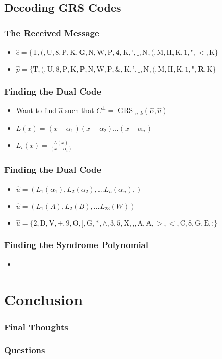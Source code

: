 \documentclass{beamer}
\begin{document}
\subsection{Decoding GRS Codes}

\begin{frame}
	\frametitle{The Received Message}
	\begin{itemize}
		\item $\hat{c} = \{\text{T}, \text{(}, \text{U}, \text{8}, \text{P}, \text{K}, \textbf{G}, \text{N}, \text{W}, \text{P}, \textbf{4}, \text{K}, \text{'}, \text{\_}, \text{N}, \text{(}, \text{M}, \text{H}, \text{K}, \text{1}, \text{"}, <, \text{K}\}$
		\item $\hat{p} = \{\text{T}, \text{(}, \text{U}, \text{8}, \text{P}, \text{K}, \textbf{P}, \text{N}, \text{W}, \text{P}, \textbf{\&}, \text{K}, \text{'}, \text{\_}, \text{N}, \text{(}, \text{M}, \text{H}, \text{K}, \text{1}, \text{"}, \textbf{R}, \text{K}\}$
	\end{itemize}
\end{frame}

\begin{frame}
	\frametitle{Finding the Dual Code}
	\begin{itemize}
		\item Want to find $\hat{u}$ such that $C^{\perp} = $ GRS $_{n,k}(\hat{\alpha}, \hat{u})$
		\item $L(x) = (x - \alpha_{1})(x - \alpha_{2})...(x - \alpha_{n})$
		\item $L_{i}(x) = \frac{L(x)}{(x - \alpha_{i})}$
	\end{itemize}
\end{frame}

\begin{frame}
	\frametitle{Finding the Dual Code}
	\begin{itemize}
		\item $\hat{u} = (L_{1}(\alpha_{1}), L_{2}(\alpha_{2}), ... L_{n}(\alpha_{n}),) $
		\item $\hat{u} = (L_{1}(A), L_{2}(B), ... L_{23}(W)) $
		\item $\hat{u} = \{\text{2}, \text{D}, \text{V}, +, \text{9}, \text{O}, ], \text{G}, *, \wedge, \text{3}, \text{5}, \text{X}, \text{,}, \text{A}, \text{A}, >, <, \text{C}, \text{8}, \text{G}, \text{E}, \text{:}\} $
	\end{itemize}
\end{frame}

\begin{frame}
	\frametitle{Finding the Syndrome Polynomial}
	\begin{itemize}
	\item
	\end{itemize}
\end{frame}


\section{Conclusion}

\begin{frame}
	\frametitle{Final Thoughts}
\end{frame}

\begin{frame}
	\frametitle{Questions}
\end{frame}
\end{document}
